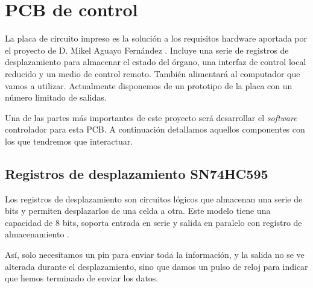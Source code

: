 \smallskip

\section{PCB de control}

La placa de circuito impreso es la solución a los requisitos hardware aportada por el proyecto de D. Mikel Aguayo Fernández \cite{mikel}. Incluye una serie de registros de desplazamiento para almacenar el estado del órgano, una interfaz de control local reducido y un medio de control remoto. También alimentará al computador que vamos a utilizar. Actualmente disponemos de un prototipo de la placa con un número limitado de salidas.

Una de las partes más importantes de este proyecto será desarrollar el \textit{software} controlador para esta PCB. A continuación detallamos aquellos componentes con los que tendremos que interactuar.

\subsection{Registros de desplazamiento SN74HC595}

Los registros de desplazamiento son circuitos lógicos que almacenan una serie de bits y permiten desplazarlos de una celda a otra. Este modelo tiene una capacidad de 8 bits, soporta entrada en serie y salida en paralelo con registro de almacenamiento \cite{shiftreg}. 

Así, solo necesitamos un pin para enviar toda la información, y la salida no se ve alterada durante el desplazamiento, sino que damos un pulso de reloj para indicar que hemos terminado de enviar los datos.

\smallskip

